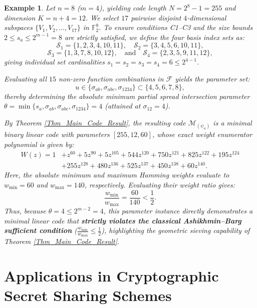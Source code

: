 \documentclass[10pt,a4paper]{amsart}
\newtheorem{example}{Example}%
\begin{document}
\begin{example}\label{ex:AB_violated}
Let $n = 8$ ($m = 4$), yielding code length $N = 2^8 - 1 = 255$ and dimension $K = n + 4 = 12$. We select $17$ pairwise disjoint $4$-dimensional subspaces $\{V_1, V_2, \ldots, V_{17}\}$ in $\mathbb{F}_2^8$. To ensure conditions C1--C3 and the size bounds $2 \le s_a \le 2^{m-1} = 8$ are strictly satisfied, we define the four basis index sets as:
\[
\mathcal{S}_1 = \{1, 2, 3, 4, 10, 11\}, \quad \mathcal{S}_2 = \{3, 4, 5, 6, 10, 11\},
\]
\[
\mathcal{S}_3 = \{1, 3, 7, 8, 10, 12\}, \quad \text{and} \quad \mathcal{S}_4 = \{2, 3, 5, 9, 11, 12\},
\]
giving individual set cardinalities $s_1 = s_2 = s_3 = s_4 = 6 \le 2^{4-1}$.

Evaluating all $15$ non-zero function combinations in $\mathcal{F}$ yields the parameter set:
\[
u \in \{\sigma_{ab}, \sigma_{abc}, \sigma_{1234}\} \subset \{4, 5, 6, 7, 8\},
\]
thereby determining the absolute minimum partial spread intersection parameter $\theta = \min \{s_a, \sigma_{ab}, \sigma_{abc}, \sigma_{1234}\} = 4$ (attained at $\sigma_{12} = 4$).

By Theorem \ref{Thm_Main_Code_Result}, the resulting code $\mathcal{M}_{(\psi_a)}$ is a minimal binary linear code with parameters $[255, 12, 60]$, whose exact weight enumerator polynomial is given by:
\[
\begin{aligned}
W(z) = 1 &+ z^{60} + 5z^{90} + 5z^{105} + 544z^{120} + 750z^{121} + 825z^{122} + 195z^{124} \\
&+ 255z^{128} + 480z^{136} + 525z^{137} + 450z^{138} + 60z^{140}.
\end{aligned}
\]
Here, the absolute minimum and maximum Hamming weights evaluate to $w_{\min} = 60$ and $w_{\max} = 140$, respectively. Evaluating their weight ratio gives:
\[
\frac{w_{\min}}{w_{\max}} = \frac{60}{140}< \frac{1}{2}.
\]
Thus, because $\theta = 4 \le 2^{m-2} = 4$, this parameter instance directly demonstrates a minimal linear code that \textbf{strictly violates the classical Ashikhmin--Barg sufficient condition} ($\frac{w_{\min}}{w_{\max}} \le \frac{1}{2}$), highlighting the geometric sieving capability of Theorem \ref{Thm_Main_Code_Result}.
\end{example}







\section{Applications in Cryptographic Secret Sharing Schemes}
\end{document}
